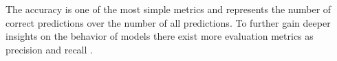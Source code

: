 The accuracy is one of the most simple metrics and represents the number of correct predictions over the number of all predictions.
To further gain deeper insights on the behavior of models there exist more evaluation metrics as precision and recall \cite{Ger17-HandsOn}.

